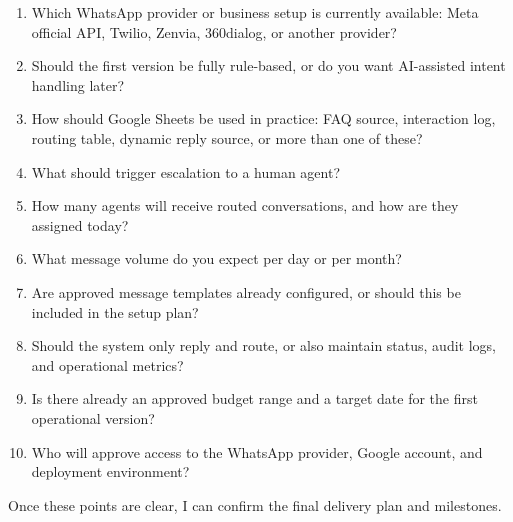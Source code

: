 \documentclass[11pt,a4paper]{article}
\begin{document}
\begin{enumerate}
\item Which WhatsApp provider or business setup is currently available: Meta official API, Twilio, Zenvia, 360dialog, or another provider?
\item Should the first version be fully rule-based, or do you want AI-assisted intent handling later?
\item How should Google Sheets be used in practice: FAQ source, interaction log, routing table, dynamic reply source, or more than one of these?
\item What should trigger escalation to a human agent?
\item How many agents will receive routed conversations, and how are they assigned today?
\item What message volume do you expect per day or per month?
\item Are approved message templates already configured, or should this be included in the setup plan?
\item Should the system only reply and route, or also maintain status, audit logs, and operational metrics?
\item Is there already an approved budget range and a target date for the first operational version?
\item Who will approve access to the WhatsApp provider, Google account, and deployment environment?
\end{enumerate}

Once these points are clear, I can confirm the final delivery plan and milestones.\par
\end{document}

